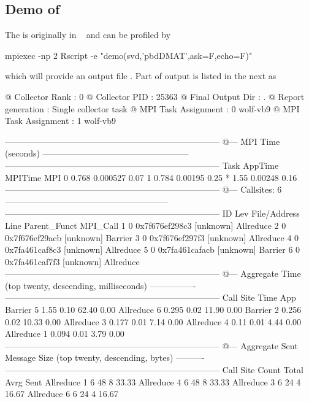 \subsection{Demo of }

The  is originally in
~\citep{Schmidt2012pbdBASEpackage}
and can be profiled by
\begin{Code}
mpiexec -np 2 Rscript -e "demo(svd,'pbdDMAT',ask=F,echo=F)"
\end{Code}
which will provide an output file .
Part of output is listed in the next as
\begin{Output}
@ Collector Rank           : 0
@ Collector PID            : 25363
@ Final Output Dir         : .
@ Report generation        : Single collector task
@ MPI Task Assignment      : 0 wolf-vb9
@ MPI Task Assignment      : 1 wolf-vb9

---------------------------------------------------------------------------
@--- MPI Time (seconds) ---------------------------------------------------
---------------------------------------------------------------------------
Task   AppTime  MPITime     MPI%
0      0.768   0.000527     0.07
1      0.784    0.00195     0.25
*       1.55    0.00248     0.16
---------------------------------------------------------------------------
@--- Callsites: 6 ---------------------------------------------------------
---------------------------------------------------------------------------
ID Lev File/Address        Line Parent_Funct             MPI_Call
1   0 0x7f676ef298c3           [unknown]                Allreduce
2   0 0x7f676ef29acb           [unknown]                Barrier
3   0 0x7f676ef297f3           [unknown]                Allreduce
4   0 0x7fa461caf8c3           [unknown]                Allreduce
5   0 0x7fa461cafacb           [unknown]                Barrier
6   0 0x7fa461caf7f3           [unknown]                Allreduce
---------------------------------------------------------------------------
@--- Aggregate Time (top twenty, descending, milliseconds) ----------------
---------------------------------------------------------------------------
Call                 Site       Time    App%
Barrier                 5       1.55    0.10   62.40    0.00
Allreduce               6      0.295    0.02   11.90    0.00
Barrier                 2      0.256    0.02   10.33    0.00
Allreduce               3      0.177    0.01    7.14    0.00
Allreduce               4       0.11    0.01    4.44    0.00
Allreduce               1      0.094    0.01    3.79    0.00
---------------------------------------------------------------------------
@--- Aggregate Sent Message Size (top twenty, descending, bytes) ----------
---------------------------------------------------------------------------
Call                 Site      Count      Total       Avrg  Sent%
Allreduce               1          6         48          8  33.33
Allreduce               4          6         48          8  33.33
Allreduce               3          6         24          4  16.67
Allreduce               6          6         24          4  16.67
\end{Output}

